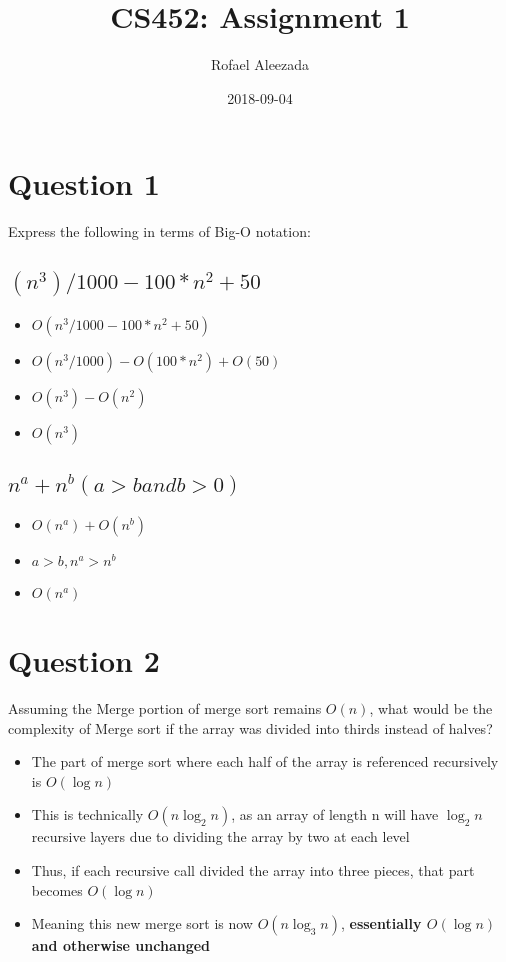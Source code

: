 \documentclass{report}
\title{CS452: Assignment 1}
\date{2018-09-04}
\author{Rofael Aleezada}
\begin{document}
    \maketitle

    \section{Question 1}
    Express the following in terms of Big-O notation:
        \subsection{$(n^3)/1000 - 100 * n^2 + 50$}
        	\begin{itemize}
        		\item{$O(n^3 / 1000 - 100 * n^2 + 50)$}
        		\item{$O(n^3 / 1000) - O(100*n^2) + O(50)$}
        		\item{$O(n^3) - O(n^2)$}
        		\item\textbf{{$O(n^3)$}}
        	\end{itemize}

        \subsection{$n^a + n^b (a > b and b > 0)$}
        	\begin{itemize}
        		\item{$O(n^a) + O(n^b)$}
        		\item{$a > b, n^a > n^b$}
        		\item\textbf{{$O(n^a)$}}
        	\end{itemize}

    \section{Question 2}
    Assuming the Merge portion of merge sort remains $O(n)$, what would be the complexity of Merge sort if the array was divided into thirds instead of halves?
        \begin{itemize}
            \item{The part of merge sort where each half of the array is referenced recursively is $O(\log n)$}
            \item{This is technically $O(n\log_2 n)$, as an array of length n will have $\log_2 n$ recursive layers due to dividing the array by two at each level}
            \item{Thus, if each recursive call divided the array into three pieces, that part becomes $O(\log n)$}
            \item{Meaning this new merge sort is now $O(n\log_3 n)$, \textbf{essentially $O(\log n)$ and otherwise unchanged}}
        \end{itemize}
\end{document}
